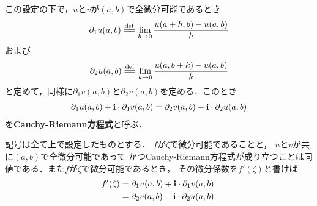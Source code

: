 	この設定の下で，$u$と$v$が$(a,b)$で全微分可能であるとき
	\begin{align}
		\partial_1 u(a,b) \defeq \lim_{h \to 0} \frac{u(a+h,b) - u(a,b)}{h}
	\end{align}
	および
	\begin{align}
		\partial_2 u(a,b) \defeq \lim_{k \to 0} \frac{u(a,b+k) - u(a,b)}{k}
	\end{align}
	と定めて，同様に$\partial_1 v(a,b)$と$\partial_2 v(a,b)$を定める．このとき
	\begin{align}
		\partial_1 u(a,b) + \mathbf{i} \cdot \partial_1 v(a,b)
		= \partial_2 v(a,b) - \mathbf{i} \cdot \partial_2 u(a,b)
	\end{align}
	を{\bf Cauchy-Riemann方程式}と呼ぶ．
	
	\begin{screen}
		\begin{thm}
		\label{thm:differentiable_iff_Cauchy_Riemann_equation_holds}
			記号は全て上で設定したものとする．
			$f$が$\zeta$で微分可能であることと，
			$u$と$v$が共に$(a,b)$で全微分可能であって
			かつCauchy-Riemann方程式が成り立つことは同値である．また$f$が$\zeta$で微分可能であるとき，
			その微分係数を$f'(\zeta)$と書けば
			\begin{align}
				f'(\zeta) &= \partial_1 u(a,b) + \mathbf{i} \cdot \partial_1 v(a,b) \\
				&= \partial_2 v(a,b) - \mathbf{i} \cdot \partial_2 u(a,b).
			\end{align}
		\end{thm}
	\end{screen}
	
